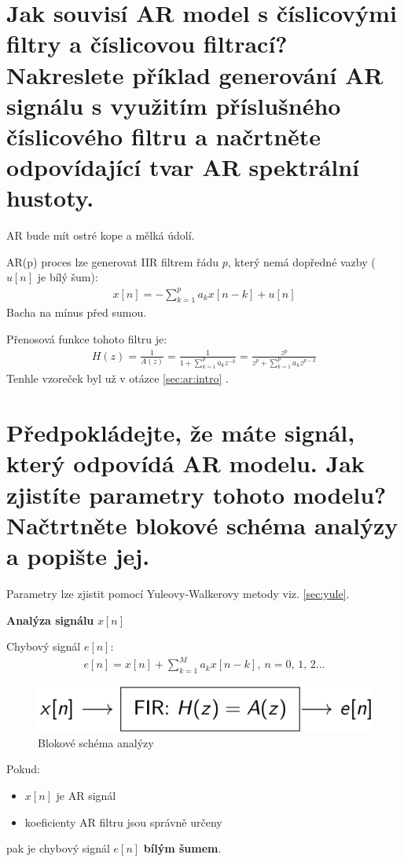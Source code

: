 \documentclass[a4paper,12pt]{article}   %
\newcommand{\mt}[1]{$#1$}
\begin{document}
\section{Jak souvisí AR model s číslicovými filtry a číslicovou filtrací? Nakreslete příklad generování AR signálu s využitím příslušného číslicového filtru a načrtněte odpovídající tvar AR spektrální hustoty.}
AR  bude mít ostré kope a mělká údolí.

AR(p) proces lze generovat IIR filtrem řádu \mt{p}, který nemá dopředné vazby (\mt{u[n]} je bílý šum):
\begin{align*}
        x[n] = -\sum^p_{k=1}a_k x[n-k] + u[n]
\end{align*}
Bacha na mínus před sumou.

Přenosová funkce tohoto filtru je:
\begin{align*}
        H(z) = \frac{1}{A(z)} = \frac{1}{1+\sum_{k=1}^p a_k z^{-k}} = \frac{z^p}{z^p + \sum_{k=1}^p a_k z^{p-k}}
\end{align*}
Tenhle vzoreček byl už v otázce \ref{sec:ar:intro} .


\section{Předpokládejte, že máte signál, který odpovídá AR modelu. Jak zjistíte parametry tohoto modelu? Načtrtněte blokové schéma analýzy a popište jej.}
Parametry lze zjistit pomocí Yuleovy-Walkerovy metody viz. \ref{sec:yule}. 

\textbf{Analýza signálu} \mt{x[n]}

Chybový signál \mt{e[n]}:
\begin{align*}
        e[n] = x[n] + \sum_{k=1}^M a_k x[n-k],~n=0,\,1,\,2...
\end{align*}

\begin{figure}[h!]
        \centering
        \includegraphics[width=.6\textwidth]{fig/AR_analysis_scheme.png}
        \caption*{Blokové schéma analýzy}
\end{figure}

Pokud:
\begin{itemize}
        \item \mt{x[n]} je AR signál
        \item koeficienty AR filtru jsou správně určeny
\end{itemize}
pak je chybový signál \mt{e[n]} \textbf{bílým šumem}.
\end{document}
